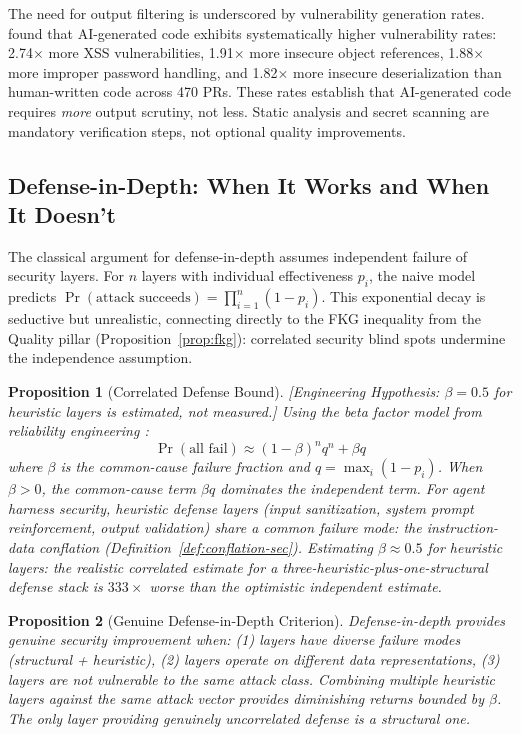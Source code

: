 \documentclass[11pt, a4paper]{googledeepmind}
\newtheorem{proposition}{Proposition}[section]
\begin{document}
The need for output filtering is underscored by vulnerability generation rates. \citet{coderabbit2025state} found that AI-generated code exhibits systematically higher vulnerability rates: 2.74$\times$ more XSS vulnerabilities, 1.91$\times$ more insecure object references, 1.88$\times$ more improper password handling, and 1.82$\times$ more insecure deserialization than human-written code across 470 PRs. These rates establish that AI-generated code requires \emph{more} output scrutiny, not less. Static analysis and secret scanning are mandatory verification steps, not optional quality improvements.

\subsection{Defense-in-Depth: When It Works and When It Doesn't}

The classical argument for defense-in-depth assumes independent failure of security layers. For $n$ layers with individual effectiveness $p_i$, the naive model predicts $\Pr(\text{attack succeeds}) = \prod_{i=1}^n (1 - p_i)$. This exponential decay is seductive but unrealistic, connecting directly to the FKG inequality from the Quality pillar (Proposition~\ref{prop:fkg}): correlated security blind spots undermine the independence assumption.

\begin{proposition}[Correlated Defense Bound]
\emph{[Engineering Hypothesis: $\beta = 0.5$ for heuristic layers is estimated, not measured.]}
\label{prop:correlated-defense}
Using the beta factor model from reliability engineering \citep{fleming1975beta}:
\begin{equation}
\Pr(\text{all fail}) \approx (1-\beta)^n q^n + \beta q
\end{equation}
where $\beta$ is the common-cause failure fraction and $q = \max_i(1-p_i)$. When $\beta > 0$, the common-cause term $\beta q$ dominates the independent term. For agent harness security, heuristic defense layers (input sanitization, system prompt reinforcement, output validation) share a common failure mode: the instruction-data conflation (Definition~\ref{def:conflation-sec}). Estimating $\beta \approx 0.5$ for heuristic layers: the realistic correlated estimate for a three-heuristic-plus-one-structural defense stack is $333\times$ worse than the optimistic independent estimate.
\end{proposition}

\begin{proposition}[Genuine Defense-in-Depth Criterion]
\label{prop:genuine-did-sec}
Defense-in-depth provides genuine security improvement when: (1) layers have diverse failure modes (structural + heuristic), (2) layers operate on different data representations, (3) layers are not vulnerable to the same attack class. Combining multiple heuristic layers against the same attack vector provides diminishing returns bounded by $\beta$. The only layer providing genuinely uncorrelated defense is a structural one.
\end{proposition}
\end{document}
